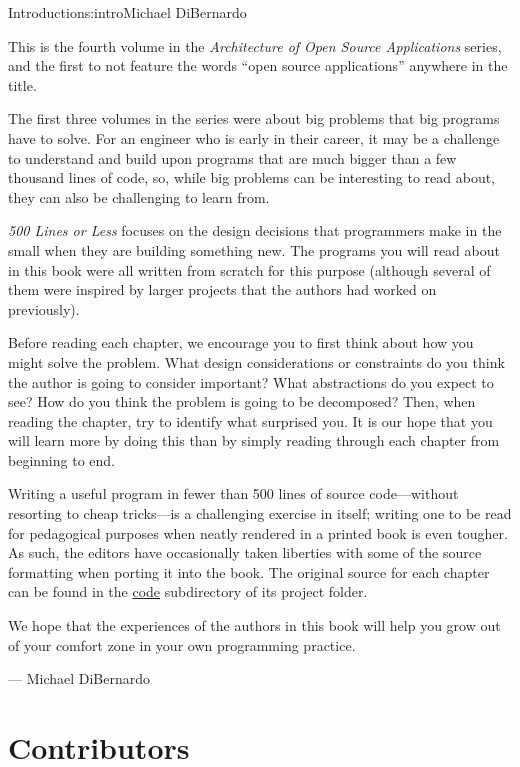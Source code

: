 \begin{aosachapter}{Introduction}{s:intro}{Michael DiBernardo}

This is the fourth volume in the \emph{Architecture of Open Source Applications}
series, and the first to not feature the words ``open source applications'' anywhere in the
title. 

The first three volumes in the series were about big problems that big programs
have to solve. For an engineer who is early in their career, it may be a
challenge to understand and build upon programs that are much bigger than a
few thousand lines of code, so, while big problems can be interesting to
read about, they can also be challenging to learn from.

\emph{500 Lines or Less} focuses on the design decisions that programmers make
in the small when they are building something new. The programs you will read about
in this book were all written from scratch for this purpose (although several
of them were inspired by larger projects that the authors had worked on previously).

Before reading each chapter, we encourage you to first think about
how you might solve the problem. What design considerations
or constraints do you think the author is going to consider important? What
abstractions do you expect to see? How do you think the problem is going to be decomposed?
Then, when reading the chapter, try to identify what surprised you. It is our
hope that you will learn more by doing this than by simply reading through each
chapter from beginning to end.

Writing a useful program in fewer than 500 lines of source code---without
resorting to cheap tricks---is a challenging exercise in itself; writing one to
be read for pedagogical purposes when neatly rendered in a printed book is even
tougher. As such, the editors have occasionally taken liberties with some of
the source formatting when porting it into the book. The original
source for each chapter can be found in the \url{code} subdirectory of its project folder. 

We hope that the experiences of the authors in this book will help you grow out
of your comfort zone in your own programming practice. 

\hspace{6cm} --- Michael DiBernardo

\newpage

\section*{Contributors}


\end{aosachapter}
